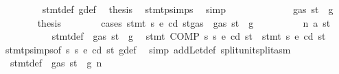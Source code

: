 \begin{isabellebody}
\ \ \ \ \ \ \isamarkupfalse%
\ {}{\isacharparenleft}{\kern0pt}{}{\isacharparenright}{\kern0pt}\ stmt{\isacharunderscore}{\kern0pt}def\ g{\isacharunderscore}{\kern0pt}def\ \isamarkupfalse%
\ {\isacharquery}{\kern0pt}thesis\ \isamarkupfalse%
\ stmt{\isachardot}{\kern0pt}psimps{\isacharparenleft}{\kern0pt}{}{\isacharparenright}{\kern0pt}\ \isamarkupfalse%
\ simp\isanewline
\ \ \ \ \isamarkupfalse%
\isanewline
\ \ \ \ \ \ \isamarkupfalse%
\ {\isachardoublequoteopen}{\isasymnot}\ gas\ st\ {\isasymle}\ g{\isachardoublequoteclose}\isanewline
\ \ \ \ \ \ \isamarkupfalse%
\ {\isacharquery}{\kern0pt}thesis\isanewline
\ \ \ \ \ \ \isamarkupfalse%
\ {\isacharparenleft}{\kern0pt}cases\ {\isachardoublequoteopen}stmt\ s{}\ e\ cd\ {\isacharparenleft}{\kern0pt}st{\isasymlparr}gas\ {\isacharcolon}{\kern0pt}{\isacharequal}{\kern0pt}\ gas\ st\ {\isacharminus}{\kern0pt}\ g{\isasymrparr}{\isacharparenright}{\kern0pt}{\isachardoublequoteclose}{\isacharparenright}{\kern0pt}\isanewline
\ \ \ \ \ \ \ \ \isamarkupfalse%
\ {\isacharparenleft}{\kern0pt}n\ a\ st{\isacharprime}{\kern0pt}{\isacharparenright}{\kern0pt}\isanewline
\ \ \ \ \ \ \ \ \isamarkupfalse%
\ {}{\isacharparenleft}{\kern0pt}{}{\isacharparenright}{\kern0pt}\ stmt{\isacharunderscore}{\kern0pt}def\ {\isacharbackquoteopen}{\isasymnot}\ gas\ st\ {\isasymle}\ g{\isacharbackquoteclose}\ \isamarkupfalse%
\ {\isachardoublequoteopen}stmt\ {\isacharparenleft}{\kern0pt}COMP\ s{}\ s{}{\isacharparenright}{\kern0pt}\ e\ cd\ st\ {\isacharequal}{\kern0pt}\ stmt\ s{}\ e\ cd\ st{\isacharprime}{\kern0pt}{\isachardoublequoteclose}\ \isamarkupfalse%
\ stmt{\isachardot}{\kern0pt}psimps{\isacharparenleft}{\kern0pt}{}{\isacharparenright}{\kern0pt}{\isacharbrackleft}{\kern0pt}of\ s{}\ s{}\ e\ cd\ st{\isacharbrackright}{\kern0pt}\ g{\isacharunderscore}{\kern0pt}def\ \isamarkupfalse%
\ {\isacharparenleft}{\kern0pt}simp\ add{\isacharcolon}{\kern0pt}Let{\isacharunderscore}{\kern0pt}def\ split{\isacharcolon}{\kern0pt}unit{\isachardot}{\kern0pt}split{\isacharunderscore}{\kern0pt}asm{\isacharparenright}{\kern0pt}\isanewline
\ \ \ \ \ \ \ \ \isamarkupfalse%
\ {}{\isacharparenleft}{\kern0pt}{}{\isacharparenright}{\kern0pt}\ stmt{\isacharunderscore}{\kern0pt}def\ {\isacartoucheopen}{\isasymnot}\ gas\ st\ {\isasymle}\ g{\isacartoucheclose}\ n\ \isamarkupfalse%

\end{isabellebody}
